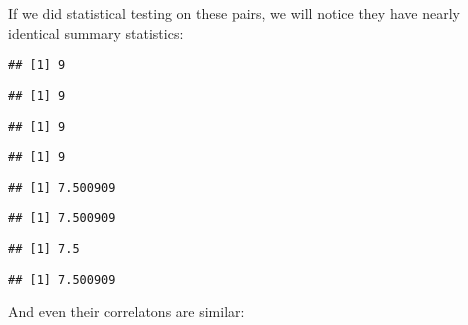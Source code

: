 \documentclass[
]{book}
\newenvironment{Shaded}{\begin{snugshade}}{\end{snugshade}}
\newcommand{\KeywordTok}[1]{\textcolor[rgb]{0.13,0.29,0.53}{\textbf{#1}}}
\newcommand{\NormalTok}[1]{#1}
\newcommand{\OperatorTok}[1]{\textcolor[rgb]{0.81,0.36,0.00}{\textbf{#1}}}
\begin{document}
If we did statistical testing on these pairs, we will notice they have nearly identical summary statistics:

\begin{Shaded}
\end{Shaded}

\begin{verbatim}
## [1] 9
\end{verbatim}

\begin{verbatim}
## [1] 9
\end{verbatim}

\begin{verbatim}
## [1] 9
\end{verbatim}

\begin{verbatim}
## [1] 9
\end{verbatim}

\begin{Shaded}
\end{Shaded}

\begin{verbatim}
## [1] 7.500909
\end{verbatim}

\begin{verbatim}
## [1] 7.500909
\end{verbatim}

\begin{verbatim}
## [1] 7.5
\end{verbatim}

\begin{verbatim}
## [1] 7.500909
\end{verbatim}

And even their correlatons are similar:
\end{document}

